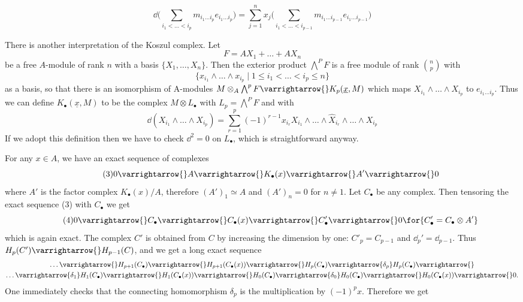 \documentclass[../main]{subfiles}
\begin{document}
\[\tag{18.2}\label{eqn:18.2} \dd\bigg(\sum_{i_1<\dots<i_p}m_{i_1 \dots i_{p}} e_{i_{1} \dots i_{p}} \bigg)=\sum_{j=1}^n x_j\bigg( \sum_{i_1<\dots<i_{p-1}}m_{i_1 \dots i_{p-1}} e_{i_{1} \dots i_{p-1}}\bigg)\]

There is another interpretation of the Koszul complex.
Let \[F=A X_{1}+\dots+AX_{n}\] be a free $A$-module of rank $n$ with a
basis $\{X_{1}, \dots, X_{n}\}$. Then the exterior product $\bigwedge^{P} F$ is a
free module of rank $\displaystyle\binom{n}{p}$ with \[\{x_{i_{1}} \wedge \dots \wedge x_{i_{p}} \mid 1 \leqslant i_{1}<\dots<i_{p} \leqslant n\}\]
as a basis, so that there is an isomorphism of A-modules $M \otimes_{A} \bigwedge^{p} F\varrightarrow{} K_{p}(\underline{x}, M)$ which maps $X_{i_{1}} \wedge \dots \wedge X_{i_{p}}$ to $e_{i_{1} \dots i_{p}}$.
Thus we can define $K_\bullet(\underline{x}, M)$ to be the complex $M \otimes L_\bullet$ with $L_{p}=\bigwedge^PF$ and with
\[\dd(X_{i_1}\wedge\dots \wedge X_{i_p}) = \sum_{r=1}^p (-1)^{r-1} x_{i_r} X_{i_1}\wedge\dots \wedge\widehat{X}_{i_r} \wedge\dots\wedge X_{i_p}\]
 If we adopt this definition then we have to check $\dd^{2}=0$ on $L_\bullet$, which is straightforward anyway.

For any $x \in A$, we have an exact sequence of complexes
\[\tag{3} 0 \varrightarrow{} A \varrightarrow{} K_\bullet (x) \varrightarrow{} A' \varrightarrow{}0\]
where $A'$ is the factor complex $K_\bullet(x) / A$, therefore $(A')_{1} \simeq A$ and $(A')_{n}=0$ for $n \neq 1$. Let $C_\bullet$ be any complex. Then tensoring the exact sequence (3) with $C_\bullet$ we get
\[\tag{4}
0 \varrightarrow{} C_\bullet\varrightarrow{}C_\bullet(x) \varrightarrow{} C'_\bullet\varrightarrow{}0 \for{C'_\bullet=C_\bullet \otimes A'}
\]
which is again exact. The complex $C'$ is obtained from $C$ by increasing the dimension by one: $C'_{p}=C_{p-1}$ and $\dd_p' = \dd_{p-1}$. Thus $H_{p}(C') \varrightarrow{} H_{p-1}(C)$, and we get a long exact sequence
\begin{gather*}\dots\varrightarrow{}H_{p+1}(C_\bullet)\varrightarrow{}H_{p+1}(C_\bullet (x))\varrightarrow{}H_p(C_\bullet)\varrightarrow{\delta_p}H_p(C_\bullet)\varrightarrow{}\\ \dots\varrightarrow{\delta_1}H_1(C_\bullet)\varrightarrow{}H_1(C_\bullet(x))\varrightarrow{}H_0(C_\bullet)\varrightarrow{\delta_0}H_0(C_\bullet)\varrightarrow{}H_0(C_\bullet(x))\varrightarrow{}0.\end{gather*}
One immediately checks that the connecting homomorphism $\delta_{p}$ is the multiplication by $(-1)^{p} x$. Therefore we get
\end{document}
